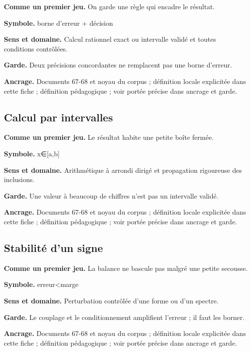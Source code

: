 \documentclass[
  9pt,
  a4paper,
]{article}
\begin{document}
\textbf{Comme un premier jeu.} On garde une règle qui encadre le
résultat.

\textbf{Symbole.} borne d'erreur + décision

\textbf{Sens et domaine.} Calcul rationnel exact ou intervalle validé et
toutes conditions contrôlées.

\textbf{Garde.} Deux précisions concordantes ne remplacent pas une borne
d'erreur.

\textbf{Ancrage.} Documents 67-68 et noyau du corpus ; définition locale
explicitée dans cette fiche ; définition pédagogique ; voir portée
précise dans ancrage et garde.

\hypertarget{calcul-par-intervalles}{%
\subsection{Calcul par intervalles}\label{calcul-par-intervalles}}

\textbf{Comme un premier jeu.} Le résultat habite une petite boîte
fermée.

\textbf{Symbole.} x∈{[}a,b{]}

\textbf{Sens et domaine.} Arithmétique à arrondi dirigé et propagation
rigoureuse des inclusions.

\textbf{Garde.} Une valeur à beaucoup de chiffres n'est pas un
intervalle validé.

\textbf{Ancrage.} Documents 67-68 et noyau du corpus ; définition locale
explicitée dans cette fiche ; définition pédagogique ; voir portée
précise dans ancrage et garde.

\hypertarget{stabilituxe9-dun-signe}{%
\subsection{Stabilité d'un signe}\label{stabilituxe9-dun-signe}}

\textbf{Comme un premier jeu.} La balance ne bascule pas malgré une
petite secousse.

\textbf{Symbole.} \textbar erreur\textbar\textless marge

\textbf{Sens et domaine.} Perturbation contrôlée d'une forme ou d'un
spectre.

\textbf{Garde.} Le couplage et le conditionnement amplifient l'erreur ;
il faut les borner.

\textbf{Ancrage.} Documents 67-68 et noyau du corpus ; définition locale
explicitée dans cette fiche ; définition pédagogique ; voir portée
précise dans ancrage et garde.
\end{document}
